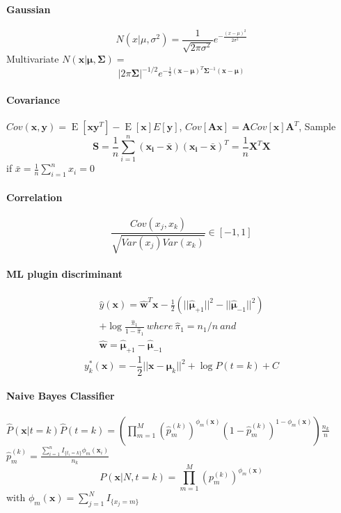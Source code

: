 \documentclass[7pt]{scrartcl}
\DeclareMathOperator{\E}{E}
\renewcommand{\vec}{\mathbf}
\begin{document}
\begin{multicols}{4}
\paragraph{Gaussian}
\[N(x|\mu,\sigma^2) = \frac{1}{\sqrt{2\pi\sigma^2}} e^{-\frac{(x-\mu)^2}{2\sigma^2}}\]
Multivariate $N(\vec{x}|\vec{\mu},\vec{\Sigma}) =$
\[|2\pi\vec{\Sigma}|^{-1/2} e^{-\frac{1}{2}(\vec{x}-\vec{\mu})^T\vec{\Sigma}^{-1}(\vec{x}-\vec{\mu})}\]
\paragraph{Covariance}
$Cov(\vec x, \vec y) = \E[\vec x \vec y ^ T] - \E[\vec x]E[\vec y]$,
$Cov[\vec A \vec x] = \vec A Cov[\vec x] \vec A^T$,
Sample 
\[\vec{S} = \frac{1}{n} \sum_{i=1}^n (\vec{x_i - \bar{x}})(\vec{x_i - \bar{x}})^T=\frac{1}{n}\vec{X}^T\vec{X}\] if $\bar{x} = \frac{1}{n} \sum_{i=1}^nx_i = 0$
\paragraph{Correlation}
\[\frac{Cov(x_j,x_k)}{\sqrt{Var(x_j)Var(x_k)}} \in [-1,1]\]

\paragraph{ML plugin discriminant}
\begin{equation*}
\begin{split}
\hat{y}(\vec{x}) = \hat{\vec{w}}^T \vec{x} - \frac{1}{2}(||\hat{\vec{\mu}}_{+1} ||^2 - || \hat{\vec{\mu}}_{-1} ||^2) \\ + \log\frac{\hat{\pi}_1}{1-\hat{\pi}_1} ~ where~ \hat{\pi}_1 = n_1 / n ~ and~  \\ \hat{\vec{w}}=\hat{\vec{\mu}}_{+1} - \hat{\vec{\mu}}_{-1}
\end{split}
\end{equation*}
\[y_k^*(\vec{x}) = -\frac{1}{2}||\vec{x}-\vec{\mu}_k||^2 + \log P(t=k) + C\]

\paragraph{Naive Bayes Classifier}
$\hat{P}(\vec x | t=k)\hat{P}(t=k) = (\prod_{m=1}^M (\hat{p}^{(k)}_m)^{\phi_m(\vec x)}(1-\hat{p}^{(k)}_m)^{1-\phi_m(\vec x)})\frac{n_k}{n}$\\
$\hat{p}_m^{(k)}=\frac{\sum_{i=1}^n I_{\{t_i=k\}} \phi_m(\vec{x}_i)}{n_k}
$
\[ P(\vec x | N,t=k) = \prod_{m=1}^M \left ( p_m^{(k)} \right
)^{\phi_m(\vec x)} \]
with $\phi_m(\vec x) = \sum_{j=1}^N I_{\{x_j = m\}}$


\end{multicols}
\end{document}
